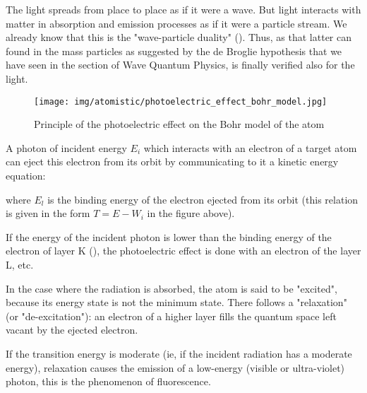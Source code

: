 	The light spreads from place to place as if it were a wave. But light interacts with matter in absorption and emission processes as if it were a particle stream. We already know that this is the  "wave-particle duality" (). Thus, as that latter can found in the mass particles as suggested by the de Broglie hypothesis that we have seen in the section of Wave Quantum Physics, is finally verified also for the light.
	\begin{figure}[H]
		\centering
		\texttt{[image: img/atomistic/photoelectric\_effect\_bohr\_model.jpg]}
		\caption{Principle of the photoelectric effect on the Bohr model of the atom}
	\end{figure}
	A photon of incident energy $E_i$ which interacts with an electron of a target atom can eject this electron from its orbit by communicating to it a kinetic energy equation:
	
	where $E_l$ is the binding energy of the electron ejected from its orbit (this relation is given in the form $T=E-W_i$ in the figure above).
	
	If the energy of the incident photon is lower than the binding energy of the electron of layer K (), the photoelectric effect is done with an electron of the layer L, etc.

In the case where the radiation is absorbed, the atom is said to be "excited", because its energy state is not the minimum state. There follows a "relaxation" (or "de-excitation"): an electron of a higher layer fills the quantum space left vacant by the ejected electron.

	If the transition energy is moderate (ie, if the incident radiation has a moderate energy), relaxation causes the emission of a low-energy (visible or ultra-violet) photon, this is the phenomenon of fluorescence. 
	
	\pagebreak
